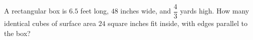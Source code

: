 A rectangular box is $6.5$ feet long, $48$ inches wide, and $\dfrac{4}{3}$ yards high. How many identical cubes of surface area $24$ square inches fit inside, with edges parallel to the box?
